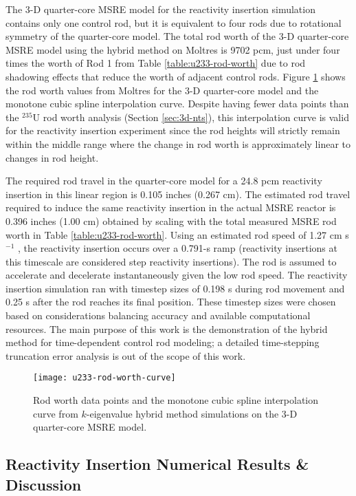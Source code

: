 The 3-D quarter-core \gls{MSRE} model for the reactivity insertion simulation contains only one
control rod, but it is equivalent to four rods due to rotational symmetry of the quarter-core model.
The total rod worth of the 3-D quarter-core \gls{MSRE} model using the hybrid method on Moltres is
9702 pcm, just under four times the worth of Rod 1 from Table \ref{table:u233-rod-worth} due to
rod shadowing effects that reduce the worth of adjacent control rods. Figure \ref{fig:u233-rod-worth-curve} shows the rod
worth values from Moltres for the 3-D quarter-core model and the monotone cubic spline interpolation
curve. Despite having fewer data points than the $^{235}$U rod worth analysis (Section
\ref{sec:3d-nts}), this interpolation curve is valid for the reactivity insertion experiment since
the rod heights will strictly remain within the middle
range where the change in rod worth is approximately linear to changes in rod height.

The required
rod travel in the quarter-core model for a 24.8 pcm reactivity insertion in this linear region
is 0.105 inches (0.267 cm). The estimated rod travel required to induce the same reactivity
insertion in the actual \gls{MSRE} reactor is 0.396 inches (1.00 cm) obtained by scaling with the
total measured \gls{MSRE} rod worth in Table \ref{table:u233-rod-worth}. Using
an estimated rod speed of 1.27 cm s$^{-1}$ \cite{robertson_msre_1965}, the reactivity insertion
occurs over a 0.791-s ramp (reactivity insertions at this timescale are considered step reactivity
insertions). The rod is assumed to accelerate and decelerate instantaneously given
the low rod speed.
The reactivity insertion simulation ran with timestep sizes of 0.198 s during rod movement and
0.25 s after the rod reaches its final position. These timestep sizes were chosen based on
considerations balancing accuracy and available computational resources. The main purpose of this
work is the demonstration of the hybrid method for time-dependent control rod modeling; a detailed
time-stepping truncation error analysis is out of the scope of this work.

\begin{figure}[t]
  \centering
  \texttt{[image: u233-rod-worth-curve]}
  \caption{Rod worth data points and the monotone cubic spline interpolation curve from $k$-eigenvalue
  hybrid method simulations on the 3-D quarter-core \gls{MSRE} model.}
  \label{fig:u233-rod-worth-curve}
\end{figure}

\subsection{Reactivity Insertion Numerical Results \& Discussion}

